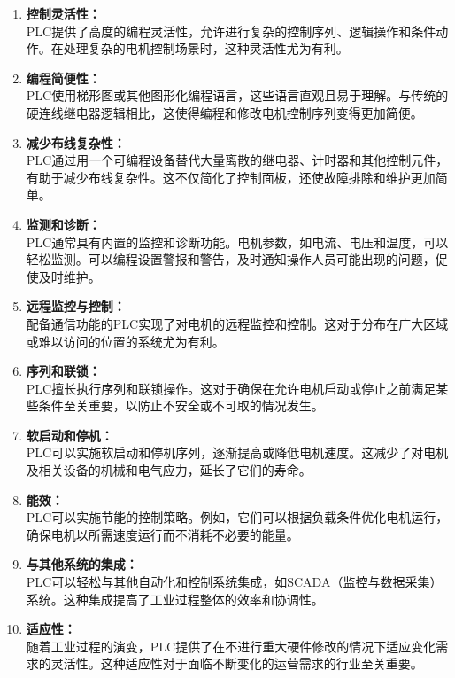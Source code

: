 \documentclass{book}
\begin{document}
\begin{enumerate}[label=\--]
	\item \textbf{控制灵活性：} \\
	PLC提供了高度的编程灵活性，允许进行复杂的控制序列、逻辑操作和条件动作。在处理复杂的电机控制场景时，这种灵活性尤为有利。
	
	\item \textbf{编程简便性：} \\
	PLC使用梯形图或其他图形化编程语言，这些语言直观且易于理解。与传统的硬连线继电器逻辑相比，这使得编程和修改电机控制序列变得更加简便。
	
	\item \textbf{减少布线复杂性：} \\
	PLC通过用一个可编程设备替代大量离散的继电器、计时器和其他控制元件，有助于减少布线复杂性。这不仅简化了控制面板，还使故障排除和维护更加简单。
	
	\item \textbf{监测和诊断：} \\
	PLC通常具有内置的监控和诊断功能。电机参数，如电流、电压和温度，可以轻松监测。可以编程设置警报和警告，及时通知操作人员可能出现的问题，促使及时维护。
	
	\item \textbf{远程监控与控制：} \\
	配备通信功能的PLC实现了对电机的远程监控和控制。这对于分布在广大区域或难以访问的位置的系统尤为有利。
	
	\item \textbf{序列和联锁：} \\
	PLC擅长执行序列和联锁操作。这对于确保在允许电机启动或停止之前满足某些条件至关重要，以防止不安全或不可取的情况发生。
	
	\item \textbf{软启动和停机：} \\
	PLC可以实施软启动和停机序列，逐渐提高或降低电机速度。这减少了对电机及相关设备的机械和电气应力，延长了它们的寿命。
	
	\item \textbf{能效：} \\
	PLC可以实施节能的控制策略。例如，它们可以根据负载条件优化电机运行，确保电机以所需速度运行而不消耗不必要的能量。
	
	\item \textbf{与其他系统的集成：} \\
	PLC可以轻松与其他自动化和控制系统集成，如SCADA（监控与数据采集）系统。这种集成提高了工业过程整体的效率和协调性。
	
	\item \textbf{适应性：} \\
	随着工业过程的演变，PLC提供了在不进行重大硬件修改的情况下适应变化需求的灵活性。这种适应性对于面临不断变化的运营需求的行业至关重要。
\end{enumerate}
\end{document}
